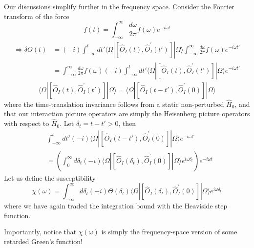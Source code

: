 Our discussions simplify further in the frequency space. Consider the Fourier transform of the force
\[ f\left( t \right) =\int_{-\infty}^{\infty}{\frac{d\omega}{2\pi}f\left( \omega \right) e^{-i\omega t}}\]
\begin{align*}
    \Rightarrow \delta O\left( t \right) &=\left( -i \right) \int_{-\infty}^t{dt'\langle \Omega |\left[ \hat{O}_I\left( t \right) ,\hat{O}_{I}^{'}\left( t' \right) \right] |\Omega \rangle \int_{-\infty}^{\infty}{\frac{d\omega}{2\pi}f\left( \omega \right) e^{-i\omega t'}}}\\
    &=\int_{-\infty}^{\infty}{\frac{d\omega}{2\pi}f\left( \omega \right) \left( -i \right) \int_{-\infty}^t{dt'\langle \Omega |\left[ \hat{O}_I\left( t \right) ,\hat{O}_{I}^{'}\left( t' \right) \right] |\Omega \rangle e^{-i\omega t'}}}
\end{align*}
\[ \langle \Omega |\left[ \hat{O}_I\left( t \right) ,\hat{O}_{I}^{'}\left( t' \right) \right] |\Omega \rangle =\langle \Omega |\left[ \hat{O}_I\left( t-t' \right) ,\hat{O}_{I}^{'}\left( 0 \right) \right] |\Omega \rangle \]
where the time-translation invariance follows from a static non-perturbed $\hat{H}_0$, and that our interaction picture operators are simply the Heisenberg picture operators with respect to $\hat{H}_0$. Let $\delta_t=t-t'>0$, then
\begin{align*}
    &\int_{-\infty}^t{dt'\left( -i \right) \langle \Omega |\left[ \hat{O}_I\left( t-t' \right) ,\hat{O}_{I}^{'}\left( 0 \right) \right] |\Omega \rangle e^{-i\omega t'}}\\
    &=\left( \int_0^{\infty}{d\delta _t\left( -i \right) \langle \Omega |\left[ \hat{O}_I\left( \delta _t \right) ,\hat{O}_{I}^{'}\left( 0 \right) \right] |\Omega \rangle e^{i\omega \delta _t}} \right) e^{-i\omega t}
\end{align*}
Let us define the susceptibility
\[ \chi \left( \omega \right) =\int_{-\infty}^{\infty}{d\delta _t\left( -i \right) \Theta \left( \delta _t \right) \langle \Omega |\left[ \hat{O}_I\left( \delta _t \right) ,\hat{O}_{I}^{'}\left( 0 \right) \right] |\Omega \rangle e^{i\omega \delta _t}}\]
where we have again traded the integration bound with the Heaviside step function.

Importantly, notice that $\chi(\omega)$ is simply the frequency-space version of some retarded Green's function!

